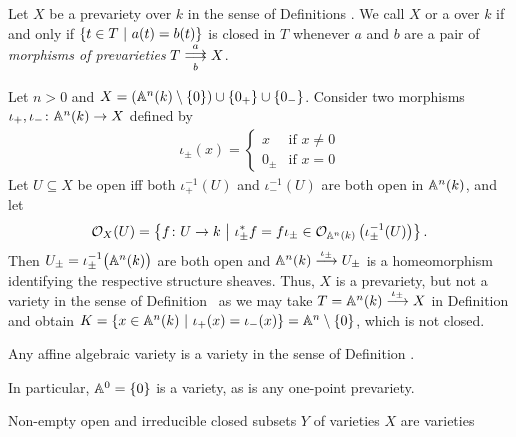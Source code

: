 \documentclass[a4paper,parskip=half,numbers=enddot, DIV=12]{scrreprt}
\begin{document}
\begin{defi}[variety]
    Let $X$ be a prevariety over $k$ in the sense of Definitions . We call $X$  or a  over $k$ if and only if $\left\{t\in T\ \middle|\  a(t)=b(t)\right\}$ is closed in $T$ whenever $a$ and $b$ are a pair of \emph{morphisms of prevarieties} $T\doublemorphism[a][b] X$. 
\end{defi}

\begin{example}
    Let $n>0$ and $X = \left( \mathbb{A}^n(k) \setminus\{0\}\right) \cup \{0_+\} \cup \{0_-\}$. Consider two morphisms $\iota_+,\iota_-\colon \mathbb{A}^n(k) \to X$ defined by
    \begin{align*}
	\iota_\pm(x) = \begin{cases} x &\text{if }x\neq 0\\
			0_\pm &\text{if } x = 0
		    \end{cases}
    \end{align*}
    Let $U\subseteq X$ be open iff both $\iota_+^{-1} (U)$ and $\iota_-^{-1}(U)$ are both open in $\mathbb{A}^n(k)$, and let 
    \begin{align*}
        \mathcal{O}_X(U) = \left\{f\colon U\to k\ \middle|\  \iota_\pm^* f = f \iota_\pm \in \mathcal{O}_{\mathbb{A}^n(k)} \left(\iota_\pm^{-1}(U)\right)\right\}.
    \end{align*}
    Then $U_\pm = \iota_\pm^{-1}\big(\mathbb{A}^n(k)\big)$ are both open and $\IA^n(k)\morphism[\iota_\pm] U_\pm$ is a homeomorphism identifying the respective structure sheaves. Thus, $X$ is a prevariety, but not a variety in the sense of Definition~ as we may take $T=\IA^n(k) \morphism[\iota_\pm] X$ in Definition  and obtain $K = \left\{x\in \mathbb{A}^n(k)\ \middle|\  \iota_+(x) = \iota_-(x)\right\} = \mathbb{A}^n\setminus\{0\}$, which is not closed.
\end{example}
\begin{example}
    \begin{alphanumerate}
    \item {}
        Any affine algebraic variety is a variety in the sense of Definition .
    \item
        In particular, $\mathbb{A}^0 = \{0\}$ is a variety, as is any one-point prevariety.
    \item 
        Non-empty open and irreducible closed subsets $Y$ of varieties $X$ are varieties 
    \end{alphanumerate}
\end{example}
\end{document}
